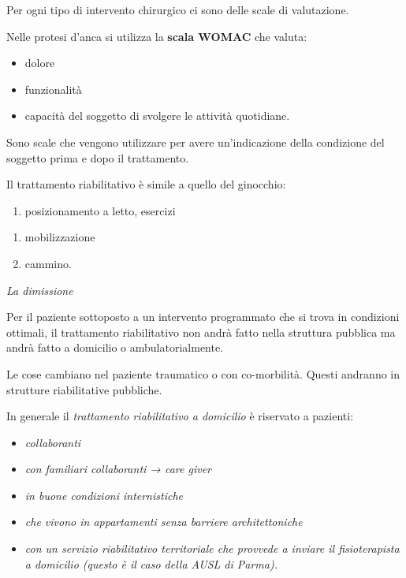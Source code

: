 \documentclass[]{article}
\begin{document}
Per ogni tipo di intervento chirurgico ci sono delle scale di
valutazione.

Nelle protesi d'anca si utilizza la \textbf{scala WOMAC} che valuta:

\begin{itemize}
\item
  dolore
\end{itemize}

\begin{itemize}
\item
  funzionalità
\item
  capacità del soggetto di svolgere le attività quotidiane.
\end{itemize}

Sono scale che vengono utilizzare per avere un'indicazione della
condizione del soggetto prima e dopo il trattamento.

Il trattamento riabilitativo è simile a quello del ginocchio:

\begin{enumerate}
\def\labelenumi{\arabic{enumi})}
\item
  posizionamento a letto, esercizi
\end{enumerate}

\begin{enumerate}
\def\labelenumi{\arabic{enumi})}
\item
  mobilizzazione
\item
  cammino.
\end{enumerate}

\emph{La dimissione}

Per il paziente sottoposto a un intervento programmato che si trova in
condizioni ottimali, il trattamento riabilitativo non andrà fatto nella
struttura pubblica ma andrà fatto a domicilio o ambulatorialmente.

Le cose cambiano nel paziente traumatico o con co-morbilità. Questi
andranno in strutture riabilitative pubbliche.

In generale il \emph{trattamento riabilitativo a domicilio} è riservato
a pazienti:

\begin{itemize}
\item
  \emph{collaboranti}
\end{itemize}

\begin{itemize}
\item
  \emph{con familiari collaboranti → care giver}
\item
  \emph{in buone condizioni internistiche}
\item
  \emph{che vivono in appartamenti senza barriere architettoniche}
\item
  \emph{con un servizio riabilitativo territoriale che provvede a
  inviare il fisioterapista a domicilio (questo è il caso della AUSL di
  Parma).}
\end{itemize}
\end{document}
